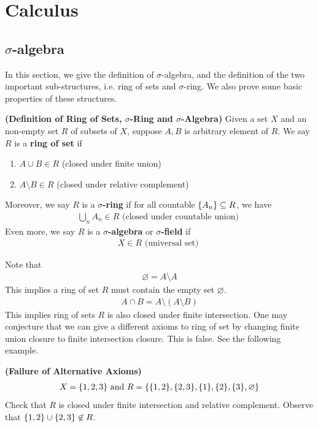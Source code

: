 \documentclass{report}
\begin{document}
\chapter{Calculus}
\section{$\sigma$-algebra} 
\begin{mdframed}
In this section, we give the definition of $\sigma$-algebra, and the definition of the two important sub-structures, i.e. ring of sets and  $\sigma$-ring. We also prove some basic properties of these structures.
\end{mdframed}
\begin{definition}
\textbf{(Definition of Ring of Sets, $\sigma$-Ring and $\sigma$-Algebra)} Given a set $X$ and an non-empty set $R$ of subsets of $X$, suppose $A,B$ is arbitrary element of $R$. We say  $R$ is a  \textbf{ring of set} if 
\begin{enumerate}[label=(\alph*)]
  \item $A\cup B \in R$ (closed under finite union)
  \item $A\setminus B \in R$ (closed under relative complement)
\end{enumerate}
Moreover, we say $R$ is a  \textbf{$\sigma$-ring} if for all countable $\{ A_n \} \subseteq R$, we have
\begin{align*}
\bigcup_{n} A_n \in R \text{ (closed under countable union) }
\end{align*}
Even more, we say $R$ is a  \textbf{$\sigma$-algebra} or \textbf{$\sigma$-field} if 
\begin{align*}
X \in R\text{ (universal set) }
\end{align*}
\end{definition}
\begin{mdframed}
Note that 
\begin{align*}
\varnothing = A \setminus  A
\end{align*}
This implies a ring of set $R$ must contain the empty set  $\varnothing$.
\begin{align*}
A\cap B= A\setminus (A\setminus B)
\end{align*}
This implies ring of sets $R$ is also closed under finite intersection. One may conjecture that we can give a different axioms to ring of set by changing finite union closure to finite intersection closure. This is false. See the following example. 
\end{mdframed}
\begin{Example}{\textbf{(Failure of Alternative Axioms)}}{}
\begin{align*}
X=\{ 1,2,3 \}\text{ and }R=\{ \{ 1,2 \},\{ 2,3 \},\{ 1 \},\{ 2 \},\{ 3 \},\varnothing \}
\end{align*}
Check that $R$ is closed under finite intersection and relative complement. Observe that $\{ 1,2 \}\cup  \{ 2,3 \}\not\in R$. 
\end{Example}
\end{document}
